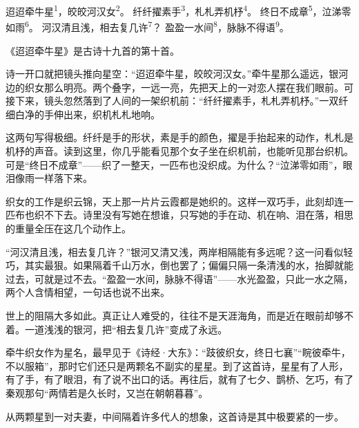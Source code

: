 
\begin{poem}
迢迢牵牛星\textsuperscript{1}，皎皎河汉女\textsuperscript{2}。
纤纤擢素手\textsuperscript{3}，札札弄机杼\textsuperscript{4}。
终日不成章\textsuperscript{5}，泣涕零如雨\textsuperscript{6}。
河汉清且浅，相去复几许\textsuperscript{7}？
盈盈一水间\textsuperscript{8}，脉脉不得语\textsuperscript{9}。
\end{poem}

\begin{annotations}
\end{annotations}

\begin{appreciation}
《迢迢牵牛星》是古诗十九首的第十首。

诗一开口就把镜头推向星空：“迢迢牵牛星，皎皎河汉女。”牵牛星那么遥远，银河边的织女那么明亮。两个叠字，一远一亮，先把天上的一对恋人摆在我们眼前。可接下来，镜头忽然落到了人间的一架织机前：“纤纤擢素手，札札弄机杼。”一双纤细白净的手伸出来，织机札札地响。

这两句写得极细。纤纤是手的形状，素是手的颜色，擢是手抬起来的动作，札札是机杼的声音。读到这里，你几乎能看见那个女子坐在织机前，也能听见那台织机。可是“终日不成章”——织了一整天，一匹布也没织成。为什么？“泣涕零如雨”，眼泪像雨一样落下来。

织女的工作是织云锦，天上那一片片云霞都是她织的。这样一双巧手，此刻却连一匹布也织不下去。诗里没有写她在想谁，只写她的手在动、机在响、泪在落，相思的重量全压在这几个动作上。

“河汉清且浅，相去复几许？”银河又清又浅，两岸相隔能有多远呢？这一问看似轻巧，其实最狠。如果隔着千山万水，倒也罢了；偏偏只隔一条清浅的水，抬脚就能过去，可就是过不去。“盈盈一水间，脉脉不得语”——水光盈盈，只此一水之隔，两个人含情相望，一句话也说不出来。

世上的阻隔大多如此。真正让人难受的，往往不是天涯海角，而是近在眼前却够不着。一道浅浅的银河，把“相去复几许”变成了永远。

牵牛织女作为星名，最早见于《诗经·大东》：“跂彼织女，终日七襄”“睆彼牵牛，不以服箱”，那时它们还只是两颗名不副实的星星。到了这首诗，星星有了人形，有了手，有了眼泪，有了说不出口的话。再往后，就有了七夕、鹊桥、乞巧，有了秦观那句“两情若是久长时，又岂在朝朝暮暮”。

从两颗星到一对夫妻，中间隔着许多代人的想象，这首诗是其中极要紧的一步。
\end{appreciation}
